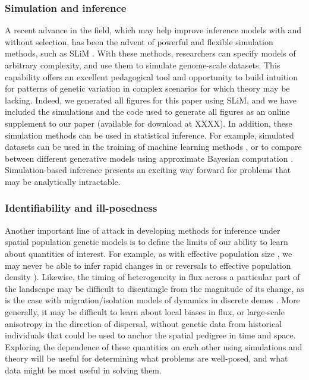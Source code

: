 \documentclass{ar-1col}
\newcommand{\todo}[1]{{\textbf{\color{red}{#1}}}}
\begin{document}
\subsubsection{Simulation and inference} 
A recent advance in the field, 
which may help improve inference models with and without selection, 
has been the advent of powerful and flexible simulation methods, 
such as SLiM \citep{haller2018forward,haller2018treesequence,kelleher2018efficient}.
With these methods, 
researchers can specify models of arbitrary complexity, 
and use them to simulate genome-scale datasets.
This capability offers an excellent pedagogical tool 
and opportunity to build intuition for patterns of genetic variation 
in complex scenarios for which theory may be lacking.
Indeed, we generated all figures for this paper using SLiM, 
and we have included the simulations 
and the code used to generate all figures 
as an online supplement to our paper 
(available for download at XXXX).
In addition, these simulation methods can be used in statistical inference.
For example, simulated datasets can be used in the training 
of machine learning methods \citep[e.g.,][]{flagel2018unreasonable}, 
or to compare between different generative models using 
approximate Bayesian computation \citep{MarjoramTavare2006modern}.
Simulation-based inference presents an exciting way forward 
for problems that may be analytically intractable.

\subsubsection{Identifiability and ill-posedness}
\todo{keep?}
Another important line of attack in developing methods for inference 
under spatial population genetic models 
is to define the limits of our ability to learn about 
quantities of interest.
For example, 
as with effective population size \citep{Myers2008},
we may never be able to infer rapid changes in 
or reversals to effective population density
\citep[although see also][]{BhaskarSong2014descartes}).
Likewise, 
the timing of heterogeneity in flux across a particular part of the landscape 
may be difficult to disentangle from the magnitude of its change, 
as is the case with migration/isolation models 
of dynamics in discrete demes \citep{sousa2011nonidentifiability}.
More generally,
it may be difficult to learn about local biases in flux, 
or large-scale anisotropy in the direction of dispersal,
without genetic data from historical individuals 
that could be used to anchor the spatial pedigree 
in time and space.
Exploring the dependence of these quantities on each other 
using simulations and theory 
will be useful for determining what problems are well-posed, 
and what data might be most useful in solving them.
\end{document}
